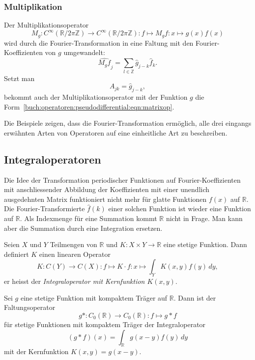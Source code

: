 \subsubsection{Multiplikation}
Der Multiplikationsoperator
\[
M_g\colon
C^{\infty}(\mathbb{R}/2\pi\mathbb{Z})
\to
C^{\infty}(\mathbb{R}/2\pi\mathbb{Z})
:
f\mapsto M_gf : x \mapsto g(x)f(x)
\]
wird durch die Fourier-Transformation in eine Faltung mit den
Fourier-Koeffizienten von $g$ umgewandelt:
\[
\widehat{M_gf}_j
=
\sum_{l\in\mathbb{Z}}
\hat{g}_{j-k}
\hat{f}_k.
\]
Setzt man
\[
A_{jk}
=
\hat{g}_{j-k},
\]
bekommt auch der Multiplikationsoperator mit der Funktion $g$ die 
Form~\eqref{buch:operatoren:pseudodifferential:eqn:matrixop}.

Die Beispiele zeigen, dass die Fourier-Transformation ermöglich,
alle drei eingangs erwähnten Arten von Operatoren auf eine einheitliche
Art zu beschreiben.

%
%
\subsection{Integraloperatoren}
Die Idee der Transformation periodischer Funktionen auf
Fourier-Koeffizienten mit anschliessender Abbildung der
Koeffizienten mit einer unendlich ausgedehnten Matrix funktioniert
nicht mehr für glatte Funktionen $f(x)$ auf $\mathbb{R}$.
Die Fourier-Transformierte $\hat{f}(k)$ einer solchen Funktion ist wieder
eine Funktion auf $\mathbb{R}$.
Als Indexmenge für eine Summation kommt $\mathbb{R}$ nicht in Frage.
Man kann aber die Summation durch eine Integration ersetzen.

\begin{definition}
Seien $X$ und $Y$ Teilmengen von $\mathbb{R}$
und $K\colon X\times Y\to\mathbb{R}$ eine stetige Funktion.
Dann definiert $K$ einen linearen Operator
\[
K
\colon
C(Y) \to C(X)
:
f \mapsto K\cdot f: x\mapsto \int_Y K(x,y) f(y)\,dy,
\]
er heisst der {\em Integraloperator mit Kernfunktion $K(x,y)$}.
%
%
\end{definition}

\begin{beispiel}
Sei $g$ eine stetige Funktion mit kompaktem Träger auf $\mathbb{R}$.
Dann ist der Faltungsoperator
%
\[
g*
\colon 
C_0(\mathbb{R})
\to
C_0(\mathbb{R})
:
f
\mapsto g*f
\]
für stetige Funktionen mit kompaktem Träger der Integraloperator
\[
(g*f)(x)
=
\int_{\mathbb R} g(x-y) f(y)\,dy
\]
mit der Kernfunktion $K(x,y) = g(x-y)$.
\end{beispiel}

